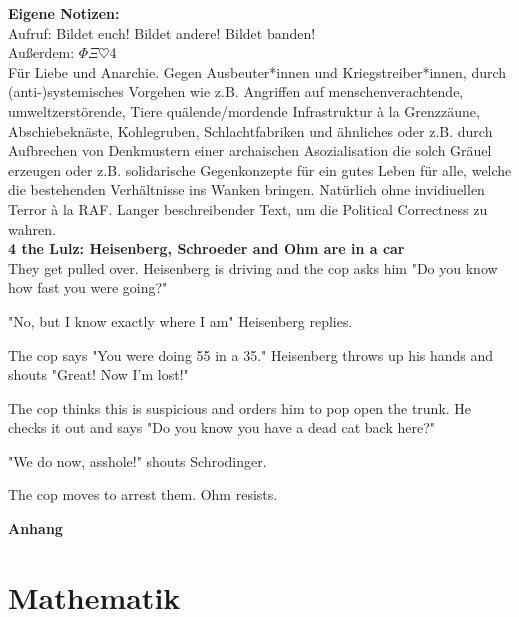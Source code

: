 \documentclass[fs, footer]{latex4ei}
\begin{document}
\begin{multicols*}{4}
\vspace{0.2cm}
{\Huge \bf Eigene Notizen:}\\

Aufruf: Bildet euch! Bildet andere! Bildet banden! \\
Außerdem: $\Phi \Xi \heartsuit$4\CircledA \\ %
Für Liebe und Anarchie. Gegen Ausbeuter*innen und Kriegstreiber*innen, durch (anti-)systemisches Vorgehen wie z.B. Angriffen auf menschenverachtende, umweltzerstörende, Tiere quälende/mordende Infrastruktur à la Grenzzäune, Abschiebeknäste, Kohlegruben, Schlachtfabriken und ähnliches oder z.B. durch Aufbrechen von Denkmustern einer archaischen Asozialisation die solch Gräuel erzeugen oder z.B. solidarische Gegenkonzepte für ein gutes Leben für alle, welche die bestehenden Verhältnisse ins Wanken bringen. Natürlich ohne invidiuellen Terror à la RAF. Langer beschreibender Text, um die Political Correctness zu wahren.\\

\textbf{4 the Lulz: Heisenberg, Schroeder and Ohm are in a car}\\
They get pulled over. Heisenberg is driving and the cop asks him "Do you know how fast you were going?"

"No, but I know exactly where I am" Heisenberg replies.

The cop says "You were doing 55 in a 35." Heisenberg throws up his hands and shouts "Great! Now I'm lost!"

The cop thinks this is suspicious and orders him to pop open the trunk. He checks it out and says "Do you know you have a dead cat back here?"

"We do now, asshole!" shouts Schrodinger.

The cop moves to arrest them. Ohm resists.



\newpage
{\Huge \bf Anhang}


\section{Mathematik}




\end{multicols*}
\end{document}
